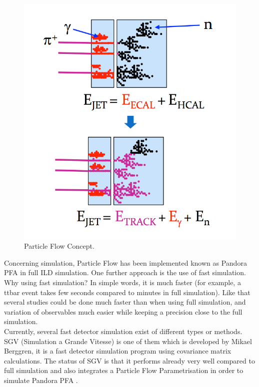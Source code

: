\documentclass[a4paper,12pt]{article}
\begin{document}
\begin{figure}
\centering
   \includegraphics[scale=0.3]{PFlow.png} 
      \caption{Particle Flow Concept.}
   \label{fig:pflow}
\end{figure}

Concerning simulation, Particle Flow has been implemented known as Pandora PFA in full ILD simulation. One further approach is the use of fast simulation. Why using fast simulation? In simple words, it is much faster (for example, a ttbar event takes few seconds compared to minutes in full simulation). Like that several studies could be done much faster than when using full simulation, and variation of observables much easier while keeping a precision close to the full simulation. \\

Currently, several fast detector simulation exist of different types or methods. SGV (Simulation a Grande Vitesse) is one of them which is developed by Mikael Berggren, it is a fast detector simulation program using covariance matrix calculations. The status of SGV is that it performs already very well compared to full simulation and also integrates a Particle Flow Parametrisation in order to simulate Pandora PFA \cite{Berggren}.\\
\end{document}
